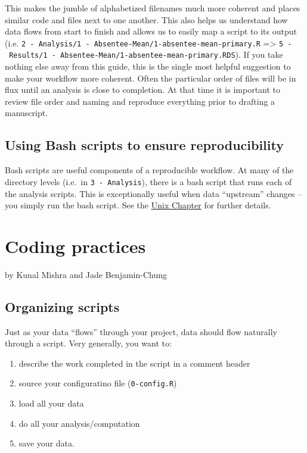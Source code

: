 \documentclass[]{book}
\providecommand{\tightlist}{%
  \setlength{\itemsep}{0pt}\setlength{\parskip}{0pt}}
\begin{document}
This makes the jumble of alphabetized filenames much more coherent and places similar code and files next to one another. This also helps us understand how data flows from start to finish and allows us to easily map a script to its output (i.e. \texttt{2\ -\ Analysis/1\ -\ Absentee-Mean/1-absentee-mean-primary.R} =\textgreater{} \texttt{5\ -\ Results/1\ -\ Absentee-Mean/1-absentee-mean-primary.RDS}). If you take nothing else away from this guide, this is the single most helpful suggestion to make your workflow more coherent. Often the particular order of files will be in flux until an analysis is close to completion. At that time it is important to review file order and naming and reproduce everything prior to drafting a manuscript.

\hypertarget{using-bash-scripts-to-ensure-reproducibility}{%
\section{Using Bash scripts to ensure reproducibility}\label{using-bash-scripts-to-ensure-reproducibility}}

Bash scripts are useful components of a reproducible workflow. At many of the directory levels (i.e.~in \texttt{3\ -\ Analysis}), there is a bash script that runs each of the analysis scripts. This is exceptionally useful when data ``upstream'' changes -- you simply run the bash script. See the \protect\hyperlink{unix}{Unix Chapter} for further details.

\hypertarget{coding-practices}{%
\chapter{Coding practices}\label{coding-practices}}

by Kunal Mishra and Jade Benjamin-Chung

\hypertarget{organizing-scripts}{%
\section{Organizing scripts}\label{organizing-scripts}}

Just as your data ``flows'' through your project, data should flow naturally through a script. Very generally, you want to:

\begin{enumerate}
\def\labelenumi{\arabic{enumi}.}
\tightlist
\item
  describe the work completed in the script in a comment header
\item
  source your configuratino file (\texttt{0-config.R})
\item
  load all your data
\item
  do all your analysis/computation
\item
  save your data.
\end{enumerate}
\end{document}
